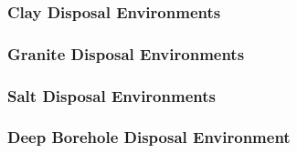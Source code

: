 

\begin{frame}[ctb!]
  \frametitle{Clay Disposal Environments}
\end{frame}

\begin{frame}[ctb!]
  \frametitle{Granite Disposal Environments}
\end{frame}

\begin{frame}[ctb!]
  \frametitle{Salt Disposal Environments}
\end{frame}

\begin{frame}[ctb!]
  \frametitle{Deep Borehole Disposal Environment}
\end{frame}
